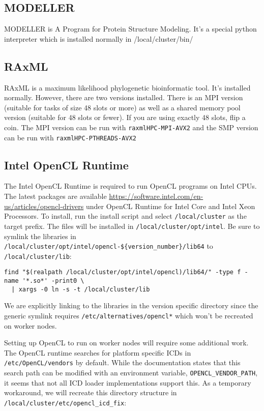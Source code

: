\documentclass[]{book}
\begin{document}
\subsection{MODELLER}\label{modeller}

MODELLER is A Program for Protein Structure Modeling. It's a special
python interpreter which is installed normally in /local/cluster/bin/

\subsection{RAxML}\label{raxml}

RAxML is a maximum likelihood phylogenetic bioinformatic tool. It's
installed normally. However, there are two versions installed. There is
an MPI version (suitable for tasks of size 48 slots or more) as well as
a shared memory pool version (suitable for 48 slots or fewer). If you
are using exactly 48 slots, flip a coin. The MPI version can be run with
\texttt{raxmlHPC-MPI-AVX2} and the SMP version can be run with
\texttt{raxmlHPC-PTHREADS-AVX2}

\subsection{Intel OpenCL Runtime}\label{intel-opencl-runtime}

The Intel OpenCL Runtime is required to run OpenCL programs on Intel
CPUs. The latest packages are available
\href{here}{https://software.intel.com/en-us/articles/opencl-drivers}
under OpenCL Runtime for Intel Core and Intel Xeon Processors. To
install, run the install script and select \texttt{/local/cluster} as
the target prefix. The files will be installed in
\texttt{/local/cluster/opt/intel}. Be sure to symlink the libraries in
\texttt{/local/cluster/opt/intel/opencl-\$\{version\_number\}/lib64} to
\texttt{/local/cluster/lib}:

\begin{verbatim}
find "$(realpath /local/cluster/opt/intel/opencl)/lib64/" -type f -name '*.so*' -print0 \
  | xargs -0 ln -s -t /local/cluster/lib
\end{verbatim}

We are explicitly linking to the libraries in the version specific
directory since the generic symlink requires
\texttt{/etc/alternatives/opencl*} which won't be recreated on worker
nodes.

Setting up OpenCL to run on worker nodes will require some additional
work. The OpenCL runtime searches for platform specific ICDs in
\texttt{/etc/OpenCL/vendors} by default. While the documentation states
that this search path can be modified with an environment variable,
\texttt{OPENCL\_VENDOR\_PATH}, it seems that not all ICD loader
implementations support this. As a temporary workaround, we will
recreate this directory structure in
\texttt{/local/cluster/etc/opencl\_icd\_fix}:
\end{document}
